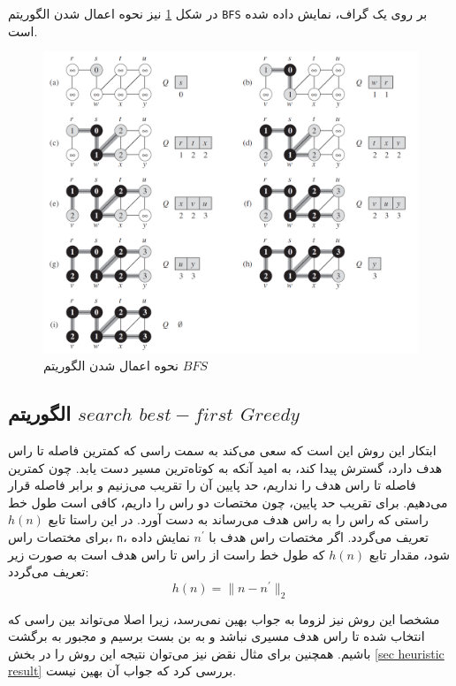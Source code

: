  در شکل \ref{Fig BFS representation} نیز نحوه اعمال شدن الگوریتم \verb|BFS| بر روی یک گراف، نمایش داده شده است.
\begin{figure}[!h]
	\centering
	\includegraphics[scale=0.4]{Images/BFS-representation.png}
	\caption{نحوه اعمال شدن الگوریتم $BFS$}\label{Fig BFS representation}
\end{figure}


\newpage
\subsection{الگوریتم $search$ $best-first$ $Greedy$}
ابتکار این روش این است که سعی می‌کند به سمت راسی که کمترین فاصله تا راس هدف دارد، گسترش پیدا کند، به امید آنکه به کوتاه‌ترین مسیر دست یابد. چون کمترین فاصله تا راس هدف را نداریم، حد پایین آن‌ را تقریب می‌زنیم و برابر فاصله قرار می‌دهیم. برای تقریب حد پایین، چون مختصات دو راس را داریم، کافی است طول خط راستی که راس را به راس هدف می‌رساند به دست آورد. در این راستا تابع $h(n)$ برای مختصات راس، \verb|n|، تعریف می‌گردد. اگر مختصات راس هدف با $n^\prime$ نمایش داده شود، مقدار تابع $h(n)$ که طول خط راست از راس تا راس هدف است به صورت زیر تعریف می‌گردد:
\begin{equation}\label{eq heuristic h}
h(n) = \|n - n^\prime\|_2
\end{equation}

مشخصا این روش نیز لزوما به جواب بهین نمی‌رسد، زیرا اصلا می‌تواند بین راسی که انتخاب شده تا راس هدف مسیری نباشد و به بن بست برسیم و مجبور به برگشت باشیم. همچنین برای مثال نقض نیز می‌توان نتیجه این روش را در بخش \ref{sec heuristic result} بررسی کرد که جواب آن بهین نیست.

